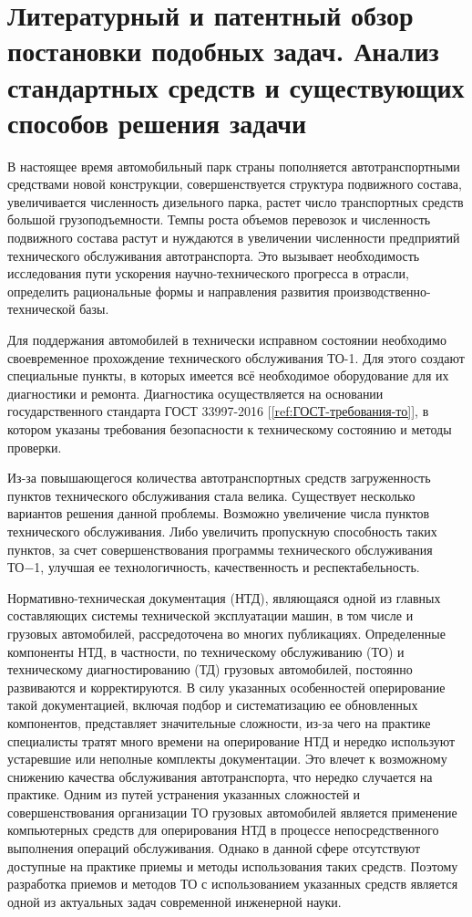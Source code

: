 \section{Литературный и патентный обзор постановки подобных задач.
Анализ стандартных средств и существующих способов решения задачи}

В настоящее время автомобильный парк страны пополняется автотранспортными
средствами новой конструкции, совершенствуется структура подвижного состава,
увеличивается численность дизельного парка, растет число транспортных средств
большой грузоподъемности. Темпы роста объемов перевозок и численность подвижного
состава растут и нуждаются в увеличении численности предприятий технического
обслуживания автотранспорта. Это вызывает необходимость исследования пути
ускорения научно-технического прогресса в отрасли, определить рациональные формы
и направления развития производственно-технической базы.

Для поддержания автомобилей в технически исправном состоянии необходимо
своевременное прохождение технического обслуживания ТО-1. Для этого создают
специальные пункты, в которых имеется всё необходимое оборудование для их
диагностики и ремонта. Диагностика осуществляется на основании государственного
стандарта ГОСТ 33997-2016 [\ref{ref:ГОСТ-требования-то}], в котором указаны
требования безопасности к техническому состоянию и методы проверки.

Из-за повышающегося количества автотранспортных средств загруженность пунктов
технического обслуживания стала велика. Существует несколько вариантов решения
данной проблемы. Возможно увеличение числа пунктов технического обслуживания.
Либо увеличить пропускную способность таких пунктов, за счет совершенствования
программы технического обслуживания ТО−1, улучшая ее технологичность,
качественность и респектабельность.

Нормативно-техническая документация (НТД), являющаяся одной из главных
составляющих системы технической эксплуатации машин, в том числе и грузовых
автомобилей, рассредоточена во многих публикациях. Определенные компоненты НТД,
в частности, по техническому обслуживанию (ТО) и техническому диагностированию
(ТД) грузовых автомобилей, постоянно развиваются и корректируются.
В силу указанных особенностей оперирование такой документацией,
включая подбор и систематизацию ее обновленных компонентов, представляет
значительные сложности, из-за чего на практике специалисты тратят много времени
на оперирование НТД и нередко используют устаревшие или неполные комплекты
документации. Это влечет к возможному снижению качества обслуживания
автотранспорта, что нередко случается на практике.
Одним из путей устранения указанных сложностей и совершенствования организации
ТО грузовых автомобилей является применение компьютерных средств для
оперирования НТД в процессе непосредственного выполнения операций обслуживания.
Однако в данной сфере отсутствуют доступные на практике приемы и методы
использования таких средств. Поэтому разработка приемов и методов ТО с
использованием указанных средств является одной из актуальных задач современной
инженерной науки.

